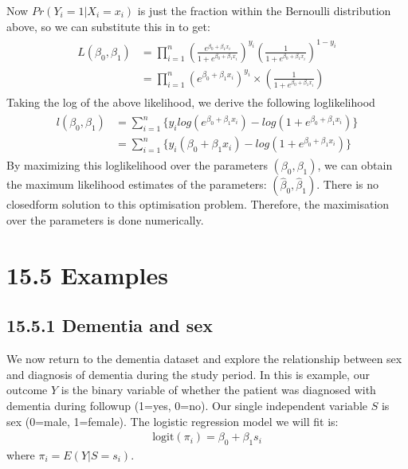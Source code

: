 \documentclass[letterpaper,10pt,english]{jupyterBook}
\begin{document}
\sphinxAtStartPar
Now \(Pr(Y_i = 1 | X_i = x_i)\) is just the fraction within the Bernoulli distribution above, so we can substitute this in to get:
\begin{equation*}
\begin{split}
\begin{align*}
L(\beta_0, \beta_1) &= \prod_{i=1}^n \left(  \frac{e^{\beta_0 + \beta_1 x_i}}{1 + e^{\beta_0 + \beta_1 x_i}} \right)^{y_i} \left( \frac{1}{1 + e^{\beta_0 + \beta_1 x_i}} \right)^{1-y_i} \\ & = \prod_{i=1}^n (e^{\beta_0 + \beta_1 x_i})^{y_i} \times \left(\frac{1}{1 + e^{\beta_0 + \beta_1 x_i}} \right) 
\end{align*}
\end{split}
\end{equation*}
\sphinxAtStartPar
Taking the log of the above likelihood, we derive the following log\sphinxhyphen{}likelihood
\begin{equation*}
\begin{split}
\begin{align*}
l(\beta_0, \beta_1) &= \sum_{i=1}^n \{ y_i log(e^{\beta_0 + \beta_1 x_i})  - log \left(1 + e^{\beta_0 + \beta_1 x_i} \right)  \} \\
 &= \sum_{i=1}^n \{ y_i (\beta_0 + \beta_1 x_i)  - log \left(1 + e^{\beta_0 + \beta_1 x_i} \right)  \}
\end{align*}
\end{split}
\end{equation*}
\sphinxAtStartPar
By maximizing this log\sphinxhyphen{}likelihood over the parameters \((\beta_0, \beta_1)\), we can obtain the maximum likelihood estimates of the parameters: \((\hat{\beta}_0, \hat{\beta}_1)\). There is no closed\sphinxhyphen{}form solution to this optimisation problem. Therefore, the maximisation over the parameters is done numerically.


\section{15.5 Examples}
\label{\detokenize{15.f. Logistic Regression:examples}}\label{\detokenize{15.f. Logistic Regression::doc}}

\subsection{15.5.1 Dementia and sex}
\label{\detokenize{15.f. Logistic Regression:dementia-and-sex}}
\sphinxAtStartPar
We now return to the dementia dataset and explore the relationship between sex and diagnosis of dementia during the study period. In this is example, our outcome \(Y\) is the binary variable of whether the patient was diagnosed with dementia during follow\sphinxhyphen{}up (1=yes, 0=no). Our single independent variable \(S\) is sex (0=male, 1=female). The logistic regression model we will fit is:
\begin{equation*}
\begin{split} 
\mathrm{logit}(\pi_i) = \beta_0 + \beta_1 s_i
\end{split}
\end{equation*}
\sphinxAtStartPar
where \(\pi_i=E(Y| S=s_i)\).
\end{document}

